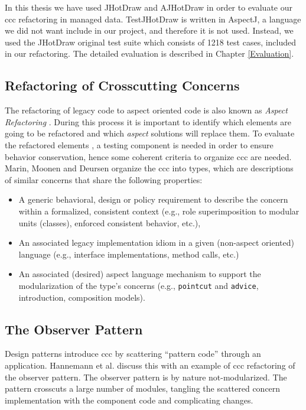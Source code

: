 In this thesis we have used JHotDraw and AJHotDraw in order to evaluate our \ac{ccc} refactoring in managed data.
TestJHotDraw is written in AspectJ, a language we did not want include in our project, and therefore it is not used.
Instead, we used the JHotDraw original test suite which consists of 1218 test cases, included in our refactoring.
The detailed evaluation is described in Chapter \ref{Evaluation}.

\subsection{Refactoring of Crosscutting Concerns}\label{Refactoring of ccc}
The refactoring of legacy code to aspect oriented code is also known as \textit{Aspect Refactoring} \cite{marin2005approach}. 
During this process it is important to identify which elements are going to be refactored and which \textit{aspect} solutions will replace them. 
To evaluate the refactored elements \cite{fowler2009refactoring}, a testing component is needed in order to ensure behavior conservation, hence some coherent criteria to organize \ac{ccc} are needed. 
Marin, Moonen and Deursen \cite{marin2005approach} organize the \ac{ccc} into types, which are descriptions of similar concerns that share the following properties: 

\begin{itemize}
	\item A generic behavioral, design or policy requirement to describe the concern within a formalized, consistent context (e.g., role superimposition to modular units (classes), enforced consistent behavior, etc.),

	\item An associated legacy implementation idiom in a given (non-aspect oriented) language (e.g., interface implementations, method calls, etc.)

	\item An associated (desired) aspect language mechanism to support the modularization of the type's concerns (e.g., \texttt{pointcut} and \texttt{advice}, introduction, composition models).
\end{itemize}

\subsection{The Observer Pattern}\label{The Observer Pattern}
Design patterns introduce \ac{ccc} by scattering ``pattern code'' through an application.
Hannemann et al. \cite{hannemann2005role} discuss this with an example of \ac{ccc} refactoring of the observer pattern.
The observer pattern is by nature not-modularized. 
The pattern crosscuts a large number of modules, tangling the scattered concern implementation with the component code and complicating changes.

